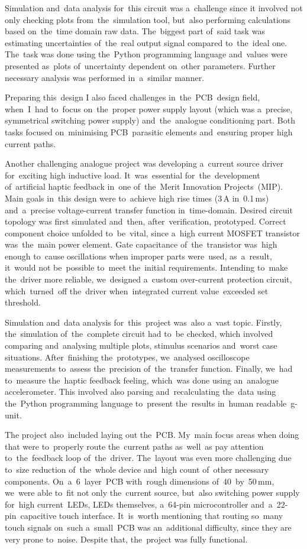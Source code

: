 \documentclass[11pt,a4paper,sans]{article}
\begin{document}
	Simulation and~data analysis for~this circuit was a~challenge since it involved not only
	checking plots from~the~simulation tool, but~also performing calculations based on~the~time 
	domain raw data. The~biggest part of~said task was estimating uncertainties of~the~real output 
	signal compared to~the~ideal one. The~task was done using the~Python programming language
	and~values were presented as~plots of~uncertainty dependent on~other parameters. Further 
	necessary analysis was performed in~a~similar manner.
	
	Preparing this~design I also faced challenges in~the~PCB~design field, when~I~had 
	to~focus on~the~proper power supply layout (which was a~precise, symmetrical
	switching power supply) and~the~analogue conditioning part. Both tasks focused on~minimising 
	PCB~parasitic elements and~ensuring proper high current paths.
	
	Another challenging analogue project was developing a~current source driver for~exciting
	high inductive load. It~was~essential for~the~development of~artificial haptic feedback
	in~one of~the~Merit Innovation Projects~(MIP). Main goals in~this design were to~achieve 
	high rise times (3$\,$A in~0.1$\,$ms) and~a~precise voltage-current transfer function  
	in~time-domain. 
	Desired circuit	topology was first simulated and~then, after~verification, prototyped.  
	Correct component choice unfolded to~be~vital, since a~high current MOSFET transistor 
	was~the~main power 
	element. Gate capacitance of~the~transistor was~high enough to~cause oscillations when improper 
	parts were~used, as~a~result, it~would not be~possible to~meet the~initial requirements. 
	Intending to~make the~driver more reliable, we~designed a~custom 
	over-current protection circuit, which~turned~off the~driver when~integrated current 
	value~exceeded set threshold.
	
	Simulation and~data analysis for~this~project was~also a~vast topic. Firstly, the~simulation
	of~the~complete circuit had to~be checked, which involved comparing and~analysing multiple 
	plots, stimulus scenarios and~worst case situations. After~finishing the~prototypes, we~analysed
	oscilloscope measurements to~assess the~precision of~the~transfer function.
	Finally, we~had to~measure the~haptic feedback feeling, which~was done using an~analogue
	accelerometer. This involved also parsing and~recalculating the~data using the~Python 
	programming	language to~present the~results in~human readable~g-unit.
	
	The project also~included laying out the~PCB. My~main focus areas when doing that were 
	to~properly
	route the~current paths as~well~as pay attention to~the~feedback loop of~the~driver.
	The~layout was even more challenging due to~size reduction of~the~whole device and~high count 
	of~other necessary components. On~a~6~layer~PCB with~rough dimensions of~40~by~50$\,$mm, we~were
	able to~fit not only the~current source, but~also switching power supply for~high current~LEDs,
	LEDs themselves, a~64-pin microcontroller and~a~\mbox{22-pin}~capacitive touch interface. 
	It~is~worth
	mentioning that routing so~many touch signals on~such a~small~PCB was an~additional difficulty,
	since they are very prone to~noise. Despite that, the~project was fully functional.
	
\end{document}
